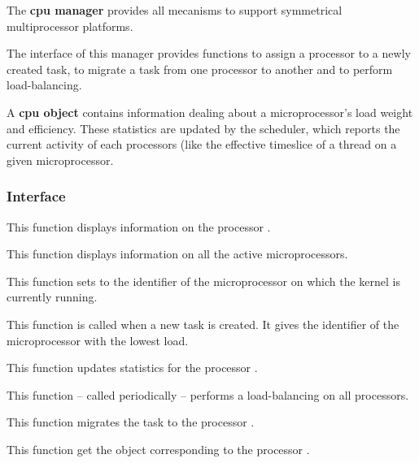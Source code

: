 The \textbf{cpu manager} provides all mecanisms to support
symmetrical multiprocessor platforms.

The interface of this manager provides functions to assign a processor
to a newly created task, to migrate a task from one processor to
another and to perform load-balancing.

A \textbf{cpu object} contains information dealing about a
microprocessor's load weight and efficiency. These statistics are
updated by the scheduler, which reports the current activity of each
processors (like the effective timeslice of a thread on a given
microprocessor.

%
%

\subsubsection{Interface}

	 {
	   This function displays information on the processor .
	 }

	 {
	   This function displays information on all the active
	   microprocessors.
	 }

	 {
	   This function sets  to the identifier of the
	   microprocessor on which the kernel is currently running.
	 }

	 {
	   This function is called when a new task is created. It gives
	   the identifier of the microprocessor with the lowest load.
	 }

	 {
	   This function updates statistics for the processor .

	 }

	 {
	   This function -- called periodically -- performs a
	   load-balancing on all processors.
	 }

	 {
	   This function migrates the task  to the
	   processor .
	 }

	 {
	   This function get the object corresponding to the processor
	   .
	 }

